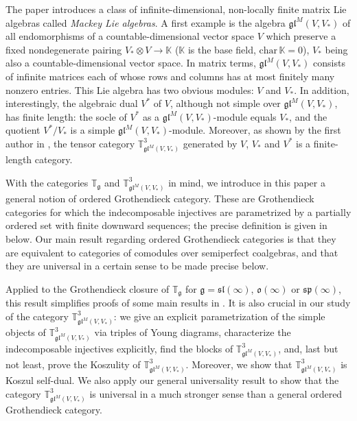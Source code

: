 \documentclass[11pt]{article}
\theoremstyle{plain}
\theoremstyle{nonumberplain}
\theoremstyle{plain}
\theoremstyle{nonumberplain}
\newcommand\bK{{\mathbb K}}
\newcommand\bT{{\mathbb T}}
\newcommand\fg{\mathfrak{g}}
\newcommand\fgl{\mathfrak{gl}}
\newcommand\fsl{\mathfrak{sl}}
\newcommand\fo{\mathfrak{o}}
\newcommand\fsp{\mathfrak{sp}}
\newcommand{\define}[1]{{\em #1}}
\begin{document}
The paper \cite{PS2} introduces a class of infinite-dimensional, non-locally finite matrix Lie algebras called \define{Mackey Lie algebras}. A first example is the algebra $\fgl^M\left(V,V_*\right)$ of all endomorphisms of a countable-dimensional vector space $V$ which preserve a fixed nondegenerate pairing $V_*\otimes V \to \bK$ ($\bK$ is the base field, $\mathrm{char}\,\bK=0$), $V_*$ being also a countable-dimensional vector space.
In matrix terms, $\fgl^M\left(V,V_*\right)$ consists of infinite matrices each of whose rows and columns has at most finitely many nonzero entries.  This Lie algebra has two obvious modules: $V$ and $V_*$.  In addition, interestingly, the algebraic dual $V^*$ of $V$, although not simple over $\fgl^M\left(V,V_*\right)$, has finite length: the socle of $V^*$ as a $\fgl^M(V,V_*)$-module equals $V_*$, and the quotient $V^*/V_*$ is a simple $\fgl^M(V,V_*)$-module. Moreover, as shown by the first author in \cite{Chi14}, the tensor category $\bT^3_{\fgl^M\left(V,V_*\right)}$ generated by $V$, $V_*$ and $V^*$ is a finite-length category. 

With the categories $\bT_{\fg}$ and $\bT^3_{\fgl^M\left(V,V_*\right)}$ in mind, we introduce in this paper a general notion of ordered Grothendieck category. These are Grothendieck categories for which the indecomposable injectives are parametrized by a partially ordered set with finite downward sequences; the precise definition is given in  below. Our main result regarding ordered Grothendieck categories is that they are equivalent to categories of comodules over semiperfect coalgebras, and that they are universal in a certain sense to be made precise below.  %


Applied to the Grothendieck closure of $\bT_{\fg}$ for $\fg=\fsl(\infty)$, $\fo(\infty)$ or $\fsp(\infty)$, this result simplifies proofs of some main results in \cite{DPS}. It is also crucial in our study of the category $\bT^3_{\fgl^M\left(V,V_*\right)}$: we give an explicit parametrization of the simple objects of $\bT^3_{\fgl^M\left(V,V_*\right)}$ via triples of Young diagrams, characterize the indecomposable injectives explicitly, find the blocks of $\bT_{\fgl^M\left(V,V_*\right)}^3$, and, last but not least, prove the Koszulity of $\bT^3_{\fgl^M\left(V,V_*\right)}$. Moreover, we show that $\bT^3_{\fgl^M\left(V,V_*\right)}$ is Koszul self-dual.   We also apply our general universality result to show that the category $\bT^3_{\fgl^M\left(V,V_*\right)}$ is universal in a much stronger sense than a general ordered Grothendieck category.%
\end{document}
